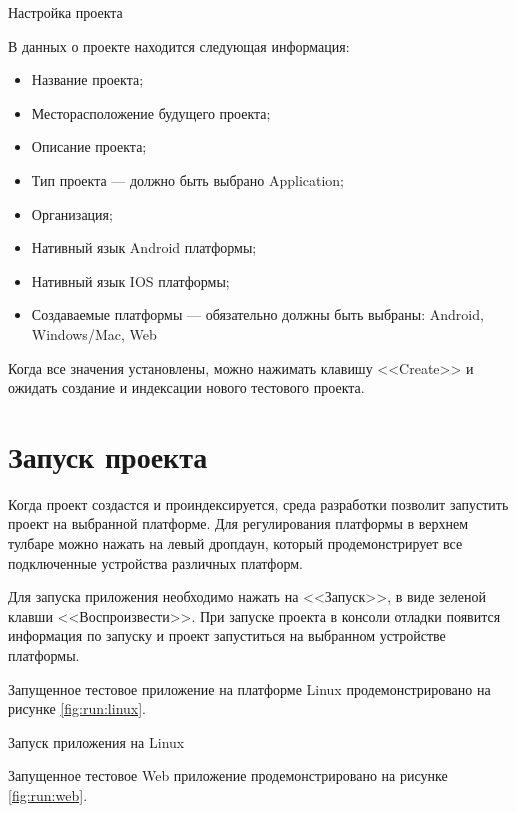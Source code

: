 \begin{image}
	\caption{Настройка проекта}
	\label{fig:setting:project}
\end{image}

В данных о проекте находится следующая информация:

\begin{itemize}
	\item Название проекта;
	\item Месторасположение будущего проекта;
	\item Описание проекта;
	\item Тип проекта --- должно быть выбрано Application;
	\item Организация;
	\item Нативный язык Android платформы;
	\item Нативный язык IOS платформы;
	\item Создаваемые платформы --- обязательно должны быть выбраны:
		Android, Windows/Mac, Web
\end{itemize}

Когда все значения установлены, можно нажимать клавишу <<Create>>
и ожидать создание и индексации нового тестового проекта.

\section{Запуск проекта}

Когда проект создастся и проиндексируется,
среда разработки позволит запустить проект на выбранной платформе.
Для регулирования платформы в верхнем тулбаре можно нажать на левый дропдаун,
который продемонстрирует все подключенные устройства различных платформ.\par
Для запуска приложения необходимо нажать на <<Запуск>>, в виде зеленой клавши
<<Воспроизвести>>. При запуске проекта в консоли отладки появится информация
по запуску и проект запуститься на выбранном устройстве платформы.

Запущенное тестовое приложение на платформе Linux
продемонстрировано на рисунке \ref{fig:run:linux}.

\begin{image}
	\caption{Запуск приложения на Linux}
	\label{fig:run:linux}
\end{image}

Запущенное тестовое Web приложение
продемонстрировано на рисунке \ref{fig:run:web}.

